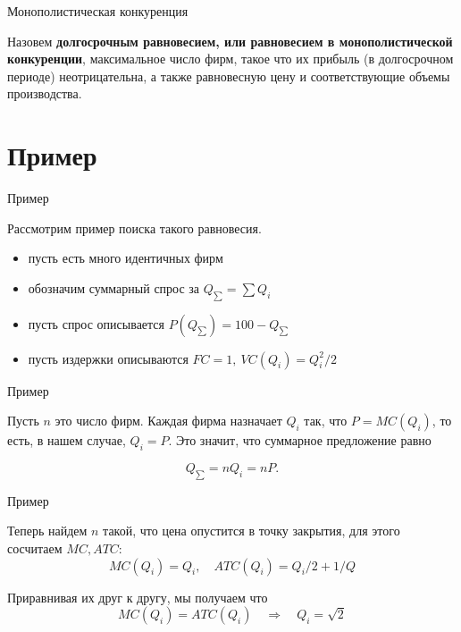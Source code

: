 \documentclass{beamer}
\begin{document}
\begin{frame}{Монополистическая конкуренция}

\begin{definition}
Назовем \textbf{долгосрочным равновесием, или равновесием в монополистической конкуренции}, максимальное число фирм, такое что их прибыль (в долгосрочном периоде) неотрицательна, а также равновесную цену и соответствующие объемы производства.
\end{definition}

\end{frame}

\section{Пример}

\begin{frame}{Пример}

Рассмотрим пример поиска такого равновесия.

\begin{itemize}
\item пусть есть много идентичных фирм
\item обозначим суммарный спрос за $Q_{\sum} = \sum Q_i$
\item пусть спрос описывается $P(Q_{\sum}) = 100 - Q_{\sum}$
\item пусть издержки описываются $FC = 1, \ VC(Q_i) = Q_i^2/2$
\end{itemize}

\end{frame}

\begin{frame}{Пример}

Пусть $n$ это число фирм. Каждая фирма назначает $Q_i$ так, что $P = MC(Q_i)$, то есть, в нашем случае, $Q_i = P$. Это значит, что суммарное предложение равно 

$$Q_{\sum} = n Q_i = n P.$$

\end{frame}

\begin{frame}{Пример}

Теперь найдем $n$ такой, что цена опустится в точку закрытия, для этого сосчитаем $MC, ATC$:
$$ MC(Q_i) = Q_i, \quad ATC(Q_i) = Q_i/2 + 1/Q$$

Приравнивая их друг к другу, мы получаем что
$$ MC(Q_i) = ATC(Q_i) \quad \Rightarrow \quad Q_i = \sqrt{2}$$

\end{frame}
\end{document}
